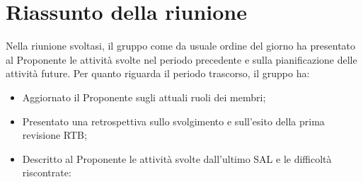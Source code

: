 \section{Riassunto della riunione}
Nella riunione svoltasi, il gruppo come da usuale ordine del giorno ha presentato al Proponente le attività svolte nel periodo precedente e sulla pianificazione delle attività future. 
Per quanto riguarda il periodo trascorso, il gruppo ha:
\begin{itemize}
    \item Aggiornato il Proponente sugli attuali ruoli dei membri;
    \item Presentato una retrospettiva sullo svolgimento e sull'esito della prima revisione RTB;
    \item Descritto al Proponente le attività svolte dall'ultimo SAL e le difficoltà riscontrate:
\end{itemize}

